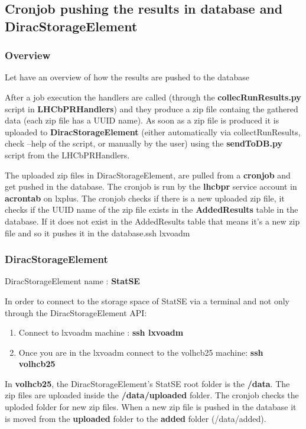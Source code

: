 \documentclass{lhcbnote}
\begin{document}
\subsection {Cronjob pushing the results in database and DiracStorageElement}

\subsubsection {Overview}

Let have an overview of how the results are pushed to the database

After a job execution the handlers are called (through the {\bf collecRunResults.py} script in {\bf LHCbPRHandlers}) 
and they produce a zip file containg the gathered data (each zip file has a UUID name). As soon as a zip file is produced 
it is uploaded to {\bf DiracStorageElement} (either automatically via collectRunResults, check --help of the script, or manually by the user) using the {\bf sendToDB.py} script 
from the LHCbPRHandlers. 

The uploaded zip files in DiracStorageElement, are pulled from a {\bf cronjob} and get pushed in the database. The cronjob is run by the {\bf lhcbpr} service account 
in {\bf acrontab} on lxplus. The cronjob checks if there is a new uploaded zip file, it checks if the UUID name of the zip file exists in the {\bf AddedResults} table in the database. If it does not exist 
in the AddedResults table that means it's a new zip file and so it pushes it in the database.ssh lxvoadm  

\subsubsection {DiracStorageElement}

DiracStorageElement name : { \bf StatSE}

In order to connect to the storage space of StatSE via a terminal and not only through the DiracStorageElement API:

\begin {enumerate}
\item
Connect to lxvoadm machine :  {\bf ssh lxvoadm}
\item
Once you are in the lxvoadm connect to the volhcb25 machine: {\bf ssh volhcb25}
\end {enumerate}

In {\bf volhcb25}, the DiracStorageElement's StatSE root folder is the {\bf /data}. The zip files are uploaded inside the {\bf /data/uploaded} folder. 
The cronjob checks the uploded folder for new zip files. When a new zip file is pushed in the database it is moved from the {\bf uploaded } folder to the {\bf added} folder (/data/added).
\end{document}
